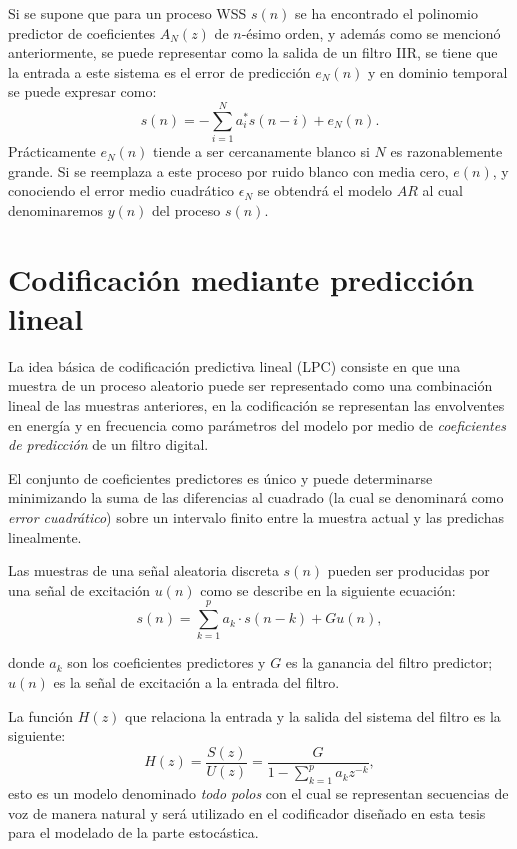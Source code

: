 Si se supone que para un proceso WSS $s(n)$ se ha encontrado el polinomio predictor de coeficientes $A_N(z)$ de $n$-ésimo orden, y además como se mencionó anteriormente, se puede representar como la salida de un filtro IIR, se tiene que la entrada a este sistema es el error de predicción $e_{N}(n)$  y en dominio temporal se puede expresar como:
\begin{equation}\label{ar_xn}
s(n) = -\sum_{i=1}^N a_i^* s(n-i)+e_N(n).
\end{equation}
Prácticamente $e_N(n)$ tiende a ser cercanamente blanco si $N$ es razonablemente grande. Si se reemplaza a este proceso por ruido blanco con media cero, $e(n)$, y conociendo el error medio cuadrático $\epsilon_N$ se obtendrá el modelo $AR$ al cual denominaremos $y(n)$ del proceso $s(n)$.

\section{Codificación mediante predicción lineal}

La idea básica de codificación predictiva lineal (LPC) consiste en que una muestra de un proceso aleatorio puede ser representado como una combinación lineal de las muestras anteriores, en la codificación se representan las envolventes en energía y en frecuencia como parámetros del modelo por medio de \emph{coeficientes de predicción} de un filtro digital.

El conjunto de coeficientes predictores es único y puede determinarse minimizando la suma de las diferencias al cuadrado (la cual se denominará como \emph{error cuadrático}) sobre un intervalo finito entre la muestra actual y las predichas linealmente.

Las muestras de una señal aleatoria discreta $s(n)$ pueden ser producidas por una señal de excitación $u(n)$ como se describe en la siguiente ecuación:
\begin{equation}\label{lpc1}
s(n) = \sum_{k=1}^p a_k \cdot s(n-k)+Gu(n),
\end{equation}

donde $a_{k}$ son los coeficientes predictores y $G$ es la ganancia del filtro predictor; $u(n)$ es la señal de excitación a la entrada del filtro. 

La función $H(z)$ que relaciona la entrada y la salida del sistema del filtro es la siguiente:
\begin{equation}\displaystyle
\label{trans_predic}
H(z) = \frac{S(z)}{U(z)}=\frac{G}{\displaystyle 1-\sum_{k=1}^{p} a_{k}z^{-k}},
\end{equation}
esto es un modelo denominado \emph{todo polos} con el cual se representan secuencias de voz de manera natural \cite[]{Rabiner1993,Rabiner1978} y será utilizado en el codificador diseñado en esta tesis para el modelado de la parte estocástica.

